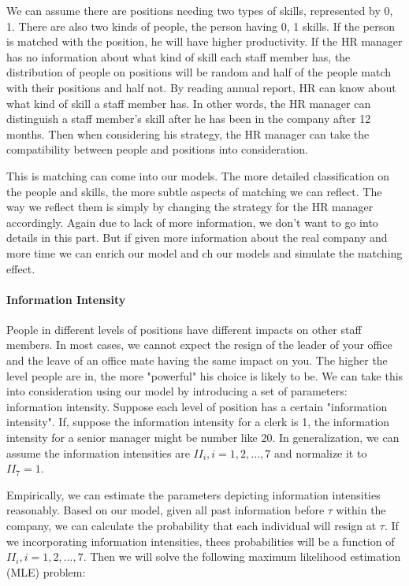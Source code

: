 \documentclass[tcn = 37075, sheet = false, abstract = false]{mcmthesis}
\begin{document}
We can assume there are positions needing two types of skills, represented by {0, 1}. There are also two kinds of people, the person having {0, 1} skills. If the person is matched with the position, he will have higher productivity. If the HR manager has no information about what kind of skill each staff member has, the distribution of people on positions will be random and half of the people match with their positions and half not. By reading annual report, HR can know about what kind of skill a staff member has. In other words, the HR manager can distinguish a staff member's skill after he has been in the company after 12 months. Then when considering his strategy, the HR manager can take the compatibility between people and positions into consideration.

This is matching can come into our models. The more detailed classification on the people and skills, the more subtle aspects of matching we can reflect. The way we reflect them is simply by changing the strategy for the HR manager accordingly. Again due to lack of more information, we don't want to go into details in this part. But if given more information about the real company and more time we can enrich our model and ch our models and simulate the matching effect.

\paragraph{Information Intensity} 

People in different levels of positions have different impacts on other staff members. In most cases, we cannot expect the resign of the leader of your office and the leave of an office mate having the same impact on you. The higher the level people are in, the more "powerful" his choice is likely to be. We can take this into consideration using our model by introducing a set of parameters: information intensity. Suppose each level of position has a certain "information intensity". If, suppose the information intensity for a clerk is 1, the information intensity for a senior manager might be number like 20. In generalization, we can assume the information intensities are $II_i, i=1, 2, ..., 7$ and normalize it to $II_7 = 1$. 

Empirically, we can estimate the parameters depicting information intensities reasonably. Based on our model, given all past information before $\tau$ within the company, we can calculate the probability that each individual
will resign at $\tau$. If we incorporating information intensities, thees probabilities will be a function of $II_i, i=1, 2, ..., 7$. Then we will solve the following maximum likelihood estimation (MLE) problem:
\end{document}
